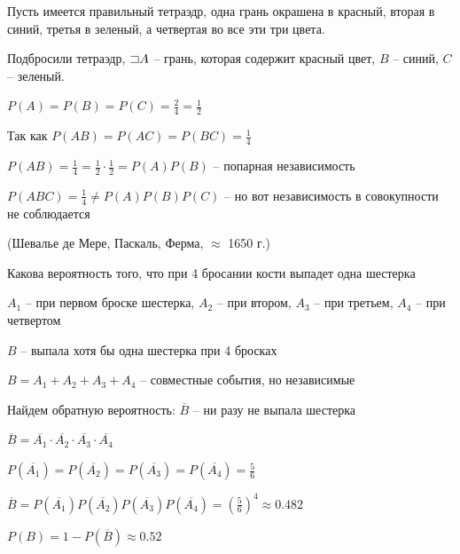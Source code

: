 \documentclass[12pt]{article}
\begin{document}
    Пусть имеется правильный тетраэдр, одна грань окрашена в красный, вторая в синий, третья в зеленый, а четвертая во все эти три цвета.

    Подбросили тетраэдр, $\mathord{\sqsupset} A$ -- грань, которая содержит красный цвет, $B$ -- синий, $C$ -- зеленый.

    $P(A) = P(B) = P(C) = \frac{2}{4} = \frac{1}{2}$

    Так как $P(AB) = P(AC) = P(BC) = \frac{1}{4}$

    $P(AB) = \frac{1}{4} = \frac{1}{2} \cdot \frac{1}{2} = P(A) P(B)$ -- попарная независимость

    $P(ABC) = \frac{1}{4} \neq P(A) P(B) P(C)$ -- но вот независимость в совокупности не соблюдается

    \Ex (Шевалье де Мере, Паскаль, Ферма, $\approx$ 1650 г.)

    Какова вероятность того, что при 4 бросании кости выпадет одна шестерка

    $A_1$ -- при первом броске шестерка, $A_2$ -- при втором, $A_3$ -- при третьем, $A_4$ -- при четвертом

    $B$ -- выпала хотя бы одна шестерка при 4 бросках

    $B = A_1 + A_2 + A_3 + A_4$ -- совместные события, но независимые

    Найдем обратную вероятность: $\overline{B}$ -- ни разу не выпала шестерка

    $\overline{B} = \overline{A_1} \cdot \overline{A_2} \cdot \overline{A_3} \cdot \overline{A_4}$

    $P(\overline{A_1}) = P(\overline{A_2}) = P(\overline{A_3}) = P(\overline{A_4}) = \frac{5}{6}$

    $\overline{B} = P(\overline{A_1}) P(\overline{A_2}) P(\overline{A_3}) P(\overline{A_4}) = \left(\frac{5}{6}\right)^4 \approx 0.482$

    $P(B) = 1 - P(\overline{B}) \approx 0.52$
\end{document}
